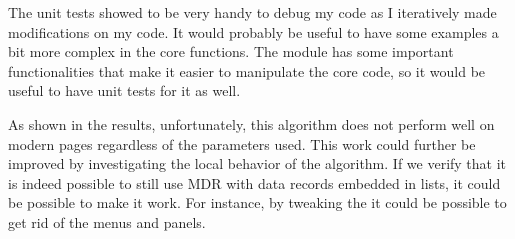 \documentclass[10pt]{article}
\begin{document}
The unit tests showed to be very handy to debug my code as I iteratively made modifications on my code. It would probably be useful to have some examples a bit more complex in the core functions. The module  has some important functionalities that make it easier to manipulate the core code, so it would be useful to have unit tests for it as well.

As shown in the results, unfortunately, this algorithm does not perform well on modern pages regardless of the parameters used. This work could further be improved by investigating the local behavior of the algorithm. If we verify that it is indeed possible to still use MDR with data records embedded in lists, it could be possible to make it work. For instance, by tweaking the  it could be possible to get rid of the menus and panels.


\newpage
 
\end{document}
